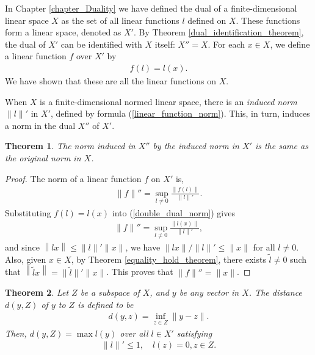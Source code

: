\documentclass[10pt]{book}
\newtheorem{theorem}{Theorem}[chapter]
\theoremstyle{definition}
\numberwithin{equation}{chapter}
\begin{document}
\medskip

In Chapter \ref{chapter_Duality} we have defined the dual of a finite-dimensional linear space $X$ as the set of all linear functions $l$ defined on $X$. These functions form a linear space, denoted as $X'$. By Theorem \ref{dual_identification_theorem}, the dual of $X'$ can be identified with $X$ itself: $X'' = X$. For each $x \in X$, we define a linear function $f$ over $X'$ by 
\begin{align*}
    f(l) = l(x).
\end{align*}
We have shown that these are all the linear functions on $X$. 

When $X$ is a finite-dimensional normed linear space, there is an {\em induced norm} $\|l\|'$ in $X'$, defined by formula (\ref{linear_function_norm}). This, in turn, induces a norm in the dual $X''$ of $X'$.

\medskip

\begin{theorem}
The norm induced in $X''$ by the induced norm in $X'$ is the same as the original norm in $X$.
\end{theorem}
\begin{proof}
The norm of a linear function $f$ on $X'$ is, 
\begin{align}\label{double_dual_norm}
    \|f\|'' = \sup_{l \neq 0} \frac{\|f(l)\|}{\|l\|'}.
\end{align}
Substituting $f(l) = l(x)$ into (\ref{double_dual_norm}) gives
\begin{align*}
    \|f\|'' = \sup_{l \neq 0} \frac{\|l(x)\|}{\|l\|'},
\end{align*}
and since $\left\|lx\right\| \leq \|l\|' \|x\|$, we have $\|lx\|/\|l\|' \leq \|x\|$ for all $l \neq 0$. Also, given $x \in X$, by Theorem \ref{equality_hold_theorem}, there exists $\tilde{l} \neq 0$ such that $\left\|\tilde{l}x\right\| = \|\tilde{l}\|' \|x\|$. This proves that $\|f\|'' = \|x\|$.
\end{proof}

\medskip

\begin{theorem}
Let $Z$ be a subspace of $X$, and $y$ be any vector in $X$. The distance $d(y,Z)$ of $y$ to $Z$ is defined to be
\begin{align*}
    d(y,z) = \inf_{z \in Z} \|y - z\|.
\end{align*}
Then, $d(y,Z) = \max l(y)$ over all $l \in X'$ satisfying 
\begin{align*}
    \|l\|' \leq 1, \quad l(z) = 0, z \in Z.
\end{align*}
\end{theorem}
\end{document}
